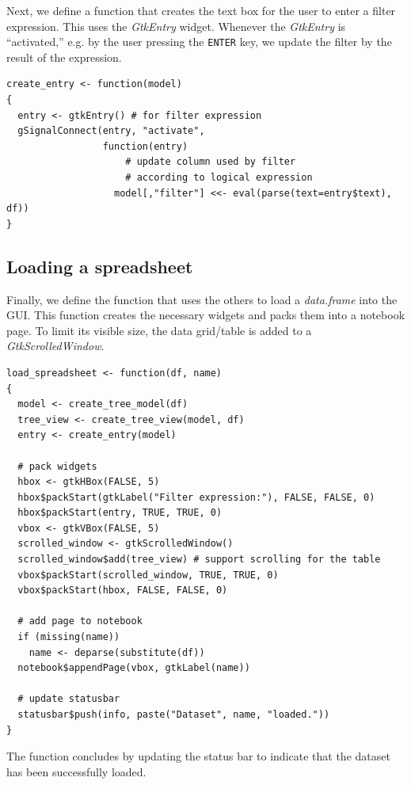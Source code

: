 \documentclass[article]{jss}
\begin{document}
Next, we define a function that creates the text box for the user to
enter a filter expression. This uses the \emph{GtkEntry} widget.
Whenever the \emph{GtkEntry} is ``activated,'' e.g. by the user
pressing the \texttt{ENTER} key, we update the filter by the result of
the  expression.
\begin{verbatim}
create_entry <- function(model)
{
  entry <- gtkEntry() # for filter expression
  gSignalConnect(entry, "activate", 
                 function(entry)
                     # update column used by filter 
                     # according to logical expression
                   model[,"filter"] <<- eval(parse(text=entry$text),
df))
}
\end{verbatim}

\subsection{Loading a spreadsheet}

Finally, we define the function that uses the others to load a
\emph{data.frame} into the GUI. This function creates the necessary
widgets and packs them into a notebook page. To limit its visible
size, the data grid/table is added to a \emph{GtkScrolledWindow}.
\begin{verbatim}
load_spreadsheet <- function(df, name)
{
  model <- create_tree_model(df)
  tree_view <- create_tree_view(model, df)
  entry <- create_entry(model)

  # pack widgets
  hbox <- gtkHBox(FALSE, 5)
  hbox$packStart(gtkLabel("Filter expression:"), FALSE, FALSE, 0)
  hbox$packStart(entry, TRUE, TRUE, 0)
  vbox <- gtkVBox(FALSE, 5)
  scrolled_window <- gtkScrolledWindow()
  scrolled_window$add(tree_view) # support scrolling for the table
  vbox$packStart(scrolled_window, TRUE, TRUE, 0)
  vbox$packStart(hbox, FALSE, FALSE, 0)

  # add page to notebook  
  if (missing(name))
    name <- deparse(substitute(df))
  notebook$appendPage(vbox, gtkLabel(name))

  # update statusbar
  statusbar$push(info, paste("Dataset", name, "loaded."))
}
\end{verbatim}
The function concludes by updating the status bar to indicate that the dataset has been successfully loaded.
\end{document}
